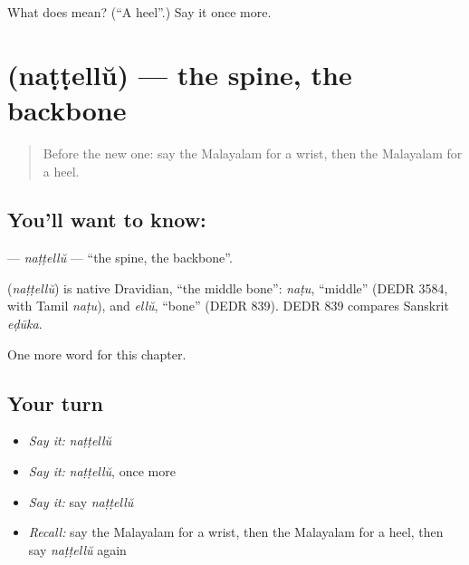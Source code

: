 \begin{tcolorbox}[breakable,colback=teal!4,colframe=teal!35!black,title={Before you move on}]
What does  mean? (\textquotedblleft{}A heel\textquotedblright{}.) Say it once more.
\end{tcolorbox}
\section[\texorpdfstring{\ml{നട്ടെല്ല്} (naṭṭellŭ)}{നട്ടെല്ല് (naṭṭellŭ)}]{ (naṭṭellŭ) — the spine, the backbone}

\label{lesson:ML-C235-nattellu}



\begin{quote}
Before the new one: say the Malayalam for a wrist, then the Malayalam for a heel.
\end{quote}

\subsection*{You'll want to know: }
\textbf{} — \emph{naṭṭellŭ} — \textquotedblleft{}the spine, the backbone\textquotedblright{}.

\begin{cousinweb}
\textbf{} (\emph{naṭṭellŭ}) is native Dravidian, \textquotedblleft{}the middle bone\textquotedblright{}: \emph{naṭu}, \textquotedblleft{}middle\textquotedblright{} (DEDR 3584, with Tamil \emph{naṭu}), and \emph{ellŭ}, \textquotedblleft{}bone\textquotedblright{} (DEDR 839). DEDR 839 compares Sanskrit \emph{eḍūka}.
\end{cousinweb}

\begin{grammarlens}[title={What you've built}]
One more word for this chapter.
\end{grammarlens}

\subsection*{Your turn}
\begin{itemize}
\raggedright
  \item \emph{Say it:} \emph{naṭṭellŭ}
  \item \emph{Say it:} \emph{naṭṭellŭ}, once more
  \item \emph{Say it:} say \emph{naṭṭellŭ}
  \item \emph{Recall:} say the Malayalam for a wrist, then the Malayalam for a heel, then say \emph{naṭṭellŭ} again
\end{itemize}

